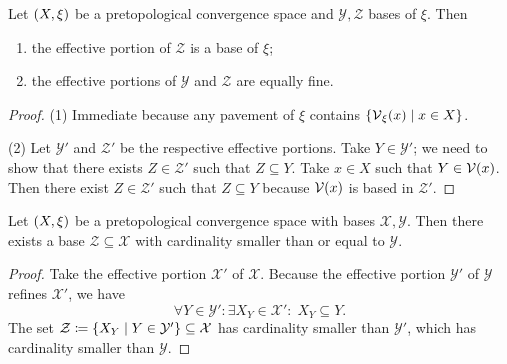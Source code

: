 \begin{lemma}
Let $\left( X,\xi \right)$ be a pretopological convergence space and $\mathcal{Y}, \mathcal{Z}$ bases of $\xi$. Then
\begin{enumerate}
\item the effective portion of $\mathcal{Z}$ is a base of $\xi$;
\item the effective portions of $\mathcal{Y}$ and $\mathcal{Z}$ are equally fine.
\end{enumerate}
\end{lemma}
\begin{proof}
(1) Immediate because any pavement of $\xi$ contains $\left\{ \operatorname{\mathcal{V}}_\xi(x) \;\middle|\; x\in X \right\}$.

(2) Let $\mathcal{Y}'$ and $\mathcal{Z}'$ be the respective effective portions. Take $Y\in \mathcal{Y}'$; we need to show that there exists $Z\in \mathcal{Z}'$ such that $Z\subseteq Y$. Take $x\in X$ such that $Y\in \operatorname{\mathcal{V}}(x)$. Then there exist $Z \in \mathcal{Z}'$ such that $Z\subseteq Y$ because $\operatorname{\mathcal{V}}(x)$ is based in $\mathcal{Z}'$. 
\end{proof}
\begin{corollary} \label{cardinalityPretopologicalBase}
Let $\left( X,\xi \right)$ be a pretopological convergence space with bases $\mathcal{X},\mathcal{Y}$. Then there exists a base $\mathcal{Z} \subseteq \mathcal{X}$ with cardinality smaller than or equal to $\mathcal{Y}$.
\end{corollary}
\begin{proof}
Take the effective portion $\mathcal{X}'$ of $\mathcal{X}$. Because the effective portion $\mathcal{Y}'$ of $\mathcal{Y}$ refines $\mathcal{X}'$, we have
\[ \forall Y\in \mathcal{Y}': \exists X_Y \in \mathcal{X}': \; X_Y\subseteq Y. \]
The set $\mathcal{Z} \coloneqq \left\{ X_Y \;\middle|\; Y\in \mathcal{Y}' \right\} \subseteq \mathcal{X}$ has cardinality smaller than $\mathcal{Y}'$, which has cardinality smaller than $\mathcal{Y}$.
\end{proof}

